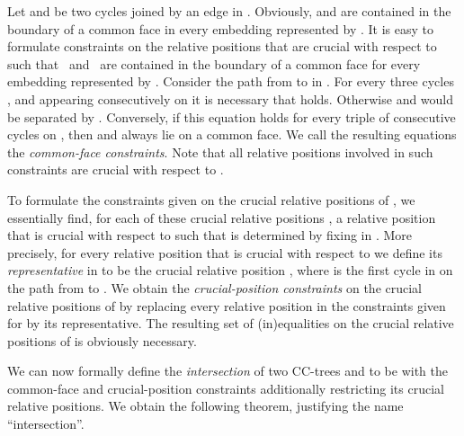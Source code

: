 \documentclass{scrartcl}
\newcommand{\1}[1]{{\normalfont \ensuremath{#1^{\tiny\circled{1}}}}} \newcommand{\2}[1]{{\normalfont \ensuremath{#1^{\tiny\circled{2}}}}} \renewcommand{\k}[1]{{\normalfont \ensuremath{#1^{\tiny\circled{k}}}}} \newcommand{\proj}[2]{\ensuremath{\left.#1\right|_{#2}}} \newcommand{\eps}{\varepsilon}
\theoremstyle{plain} \newtheorem{theorem}{Theorem} \newcounter{lemmacounter} \setcounter{lemmacounter}{0} \newtheorem{lemma}[lemmacounter]{Lemma} \newtheorem{fact}{Fact}  \newtheorem{corollary}{Corollary} \theoremstyle{definition} \newtheorem{definition}{Definition}
\begin{document}
Let  and  be two cycles joined by an edge in .  Obviously,  and  are contained in the
boundary of a common face in every embedding 
represented by .  It is easy to formulate
constraints on the relative positions that are crucial with respect to
 such that~ and~ are contained
in the boundary of a common face for every embedding represented by
.  Consider the path  from  to
 in .  For every three cycles ,
 and  appearing consecutively on  it is necessary that
 holds.  Otherwise  and  would
be separated by .  Conversely, if this equation holds for every
triple of consecutive cycles on , then  and  always lie
on a common face.  We call the resulting equations the
\emph{common-face constraints}.  Note that all relative positions
involved in such constraints are crucial with respect to .

To formulate the constraints given on the crucial relative positions
of , we essentially find, for each of
these crucial relative positions , a relative
position  that is crucial with respect to
 such that  is
determined by fixing  in .  More precisely, for every relative position
 that is crucial with respect to  we define its \emph{representative} in  to be the crucial relative position
, where  is the first cycle in  on the path from  to .  We obtain the
\emph{crucial-position constraints} on the crucial relative positions
of  by replacing every relative position
in the constraints given for  by its
representative.  The resulting set of (in)equalities on the crucial
relative positions of  is obviously
necessary.

We can now formally define the \emph{intersection}  of two CC-trees  and
 to be  with
the common-face and crucial-position constraints additionally
restricting its crucial relative positions.  We obtain the following
theorem, justifying the name ``intersection''.
\end{document}
